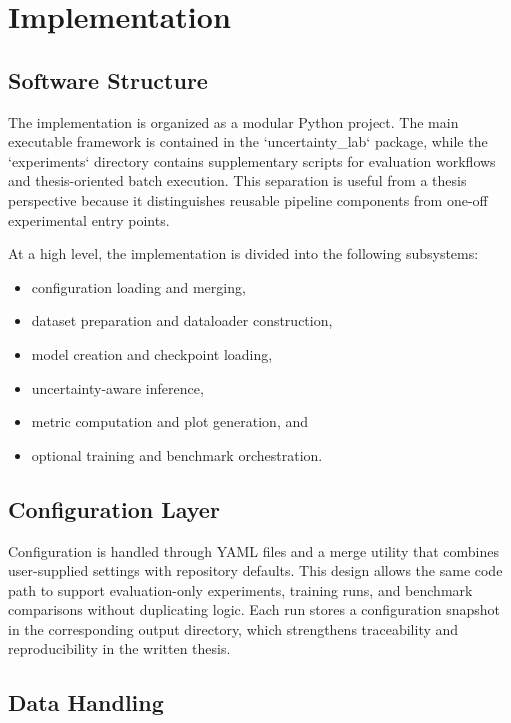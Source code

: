 \chapter{Implementation}
\label{chap:implementation}

\section{Software Structure}

The implementation is organized as a modular Python project. The main executable framework is contained in the `uncertainty_lab` package, while the `experiments` directory contains supplementary scripts for evaluation workflows and thesis-oriented batch execution. This separation is useful from a thesis perspective because it distinguishes reusable pipeline components from one-off experimental entry points.

At a high level, the implementation is divided into the following subsystems:

\begin{itemize}
    \item configuration loading and merging,
    \item dataset preparation and dataloader construction,
    \item model creation and checkpoint loading,
    \item uncertainty-aware inference,
    \item metric computation and plot generation, and
    \item optional training and benchmark orchestration.
\end{itemize}

\section{Configuration Layer}

Configuration is handled through YAML files and a merge utility that combines user-supplied settings with repository defaults. This design allows the same code path to support evaluation-only experiments, training runs, and benchmark comparisons without duplicating logic. Each run stores a configuration snapshot in the corresponding output directory, which strengthens traceability and reproducibility in the written thesis.

\section{Data Handling}

